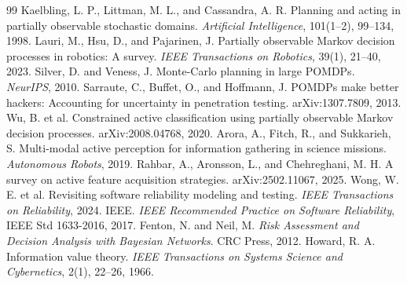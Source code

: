 \documentclass[11pt]{article}
\begin{document}
\begin{thebibliography}{99}
 Kaelbling, L. P., Littman, M. L., and Cassandra, A. R. Planning and acting in partially observable stochastic domains. \emph{Artificial Intelligence}, 101(1--2), 99--134, 1998.
 Lauri, M., Hsu, D., and Pajarinen, J. Partially observable Markov decision processes in robotics: A survey. \emph{IEEE Transactions on Robotics}, 39(1), 21--40, 2023.
 Silver, D. and Veness, J. Monte-Carlo planning in large POMDPs. \emph{NeurIPS}, 2010.
 Sarraute, C., Buffet, O., and Hoffmann, J. POMDPs make better hackers: Accounting for uncertainty in penetration testing. arXiv:1307.7809, 2013.
 Wu, B. et al. Constrained active classification using partially observable Markov decision processes. arXiv:2008.04768, 2020.
 Arora, A., Fitch, R., and Sukkarieh, S. Multi-modal active perception for information gathering in science missions. \emph{Autonomous Robots}, 2019.
 Rahbar, A., Aronsson, L., and Chehreghani, M. H. A survey on active feature acquisition strategies. arXiv:2502.11067, 2025.
 Wong, W. E. et al. Revisiting software reliability modeling and testing. \emph{IEEE Transactions on Reliability}, 2024.
 IEEE. \emph{IEEE Recommended Practice on Software Reliability}, IEEE Std 1633-2016, 2017.
 Fenton, N. and Neil, M. \emph{Risk Assessment and Decision Analysis with Bayesian Networks}. CRC Press, 2012.
 Howard, R. A. Information value theory. \emph{IEEE Transactions on Systems Science and Cybernetics}, 2(1), 22--26, 1966.
\end{thebibliography}
\end{document}
